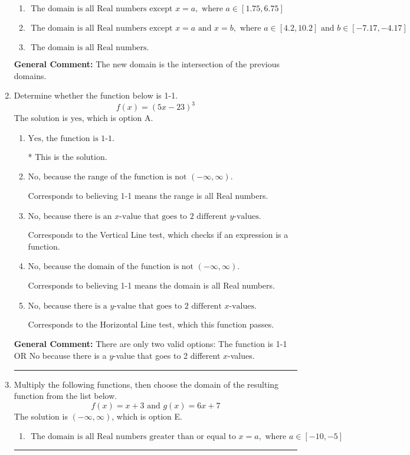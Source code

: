 \documentclass{extbook}[14pt]
\newcommand{\litem}[1]{\item #1

\rule{\textwidth}{0.4pt}}
\begin{document}
\begin{enumerate}
{\begin{enumerate}[label=\Alph*.]
\item \( \text{ The domain is all Real numbers except } x = a, \text{ where } a \in [1.75, 6.75] \)


\item \( \text{ The domain is all Real numbers except } x = a \text{ and } x = b, \text{ where } a \in [4.2, 10.2] \text{ and } b \in [-7.17, -4.17] \)


\item \( \text{ The domain is all Real numbers. } \)


\end{enumerate}

\textbf{General Comment:} The new domain is the intersection of the previous domains.
}
\litem{
Determine whether the function below is 1-1.
\[ f(x) = (5 x - 23)^3 \]The solution is \( \text{yes} \), which is option A.\begin{enumerate}[label=\Alph*.]
\item \( \text{Yes, the function is 1-1.} \)

* This is the solution.
\item \( \text{No, because the range of the function is not $(-\infty, \infty)$.} \)

Corresponds to believing 1-1 means the range is all Real numbers.
\item \( \text{No, because there is an $x$-value that goes to 2 different $y$-values.} \)

Corresponds to the Vertical Line test, which checks if an expression is a function.
\item \( \text{No, because the domain of the function is not $(-\infty, \infty)$.} \)

Corresponds to believing 1-1 means the domain is all Real numbers.
\item \( \text{No, because there is a $y$-value that goes to 2 different $x$-values.} \)

Corresponds to the Horizontal Line test, which this function passes.
\end{enumerate}

\textbf{General Comment:} There are only two valid options: The function is 1-1 OR No because there is a $y$-value that goes to 2 different $x$-values.
}
\litem{
Multiply the following functions, then choose the domain of the resulting function from the list below.
\[ f(x) = x + 3 \text{ and } g(x) = 6x + 7 \]The solution is \( (-\infty, \infty) \), which is option E.\begin{enumerate}[label=\Alph*.]
\item \( \text{ The domain is all Real numbers greater than or equal to } x = a, \text{ where } a \in [-10, -5] \)



\end{enumerate}}
\end{enumerate}
\end{document}
